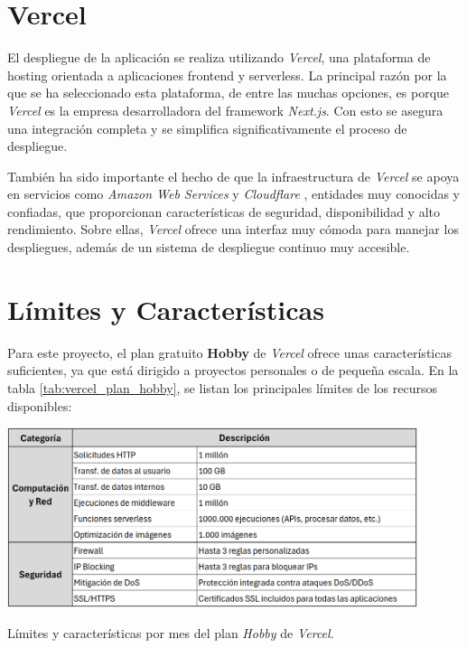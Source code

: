 \section{Vercel}

El despliegue de la aplicación se realiza utilizando \textit{Vercel}, una plataforma de hosting orientada a aplicaciones frontend y serverless. La principal razón por la que se ha seleccionado esta plataforma, de entre las muchas opciones, es porque \textit{Vercel} es la empresa desarrolladora del framework \textit{Next.js}. Con esto se asegura una integración completa y se simplifica significativamente el proceso de despliegue.

También ha sido importante el hecho de que la infraestructura de \textit{Vercel} se apoya en servicios como \textit{Amazon Web Services} y \textit{Cloudflare} \cite{vercelInfrastructure2023}, entidades muy conocidas y confiadas, que proporcionan características de seguridad, disponibilidad y alto rendimiento. Sobre ellas, \textit{Vercel} ofrece una interfaz muy cómoda para manejar los despliegues, además de un sistema de despliegue continuo muy accesible.

\section{Límites y Características}

Para este proyecto, el plan gratuito \textbf{Hobby} de \textit{Vercel} ofrece unas características suficientes, ya que está dirigido a proyectos personales o de pequeña escala. En la tabla \ref{tab:vercel_plan_hobby}, se listan los principales límites de los recursos disponibles:

\begin{table}[htbp]
    \centering
    \includegraphics[width=0.9\textwidth]{figures/despliegue/vercel_plan_hobby.png}
    \captionsetup{skip=10pt}
    \caption{Límites y características por mes del plan \textit{Hobby} de \textit{Vercel}.}
    \label{tab:vercel_plan_hobby}
\end{table}

